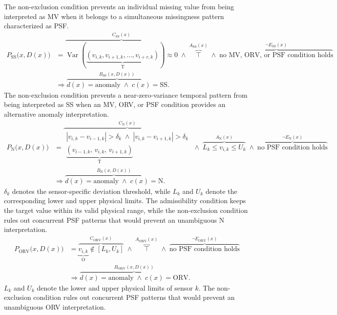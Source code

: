 \documentclass[preprint,12pt]{elsarticle}
\begin{document}
The non-exclusion condition prevents an individual missing value from being
interpreted as MV when it belongs to a simultaneous missingness pattern
characterized as PSF.
\begingroup
\scriptsize
\begin{equation}
\begin{aligned}
P_{\mathrm{SS}}\bigl(x,D(x)\bigr)
&=
\overbrace{
    \operatorname{Var}\!\left(
        \underbrace{
        (v_{i,k},v_{i+1,k},\ldots,v_{i+r,k})
        }_{\mathrm{T}}
    \right)
    \approx 0
}^{C_{\mathrm{SS}}(x)}
\;\land\;
\overbrace{
    \top
}^{A_{\mathrm{SS}}(x)}
\;\land\;
\overbrace{
    \text{no MV, ORV, or PSF condition holds}
}^{\neg E_{\mathrm{SS}}(x)}
\\[1mm]
&\Rightarrow
\overbrace{
    d(x)=\mathrm{anomaly}
    \;\land\;
    c(x)=\mathrm{SS}
}^{B_{\mathrm{SS}}(x,D(x))}.
\end{aligned}
\label{eq:property_ss}
\end{equation}
\endgroup
The non-exclusion condition prevents a near-zero-variance temporal pattern
from being interpreted as SS when an MV, ORV, or PSF condition provides an
alternative anomaly interpretation.
\begingroup
\scriptsize
\begin{equation}
\begin{aligned}
P_{\mathrm{N}}\bigl(x,D(x)\bigr)
&=
\overbrace{
    \substack{
    \left|v_{i,k}-v_{i-1,k}\right|>\delta_k
    \;\land\;
    \left|v_{i,k}-v_{i+1,k}\right|>\delta_k\\[1mm]
       \underbrace{
    (v_{i-1,k},\,v_{i,k},\,v_{i+1,k})
    }_{\mathrm{T}}
    }
}^{C_{\mathrm{N}}(x)}
\;\land\;
\overbrace{
    L_k\leq v_{i,k}\leq U_k
}^{A_{\mathrm{N}}(x)}
\;\land\;
\overbrace{
    \text{no PSF condition holds}
}^{\neg E_{\mathrm{N}}(x)}
\\[1mm]
&\Rightarrow
\overbrace{
    d(x)=\mathrm{anomaly}
    \;\land\;
    c(x)=\mathrm{N}
}^{B_{\mathrm{N}}(x,D(x))}.
\end{aligned}
\label{eq:property_n}
\end{equation}
\endgroup
\(\delta_k\) denotes the sensor-specific deviation threshold, while
\(L_k\) and \(U_k\) denote the corresponding lower and upper physical
limits. The admissibility condition keeps the target value within its valid
physical range, while the non-exclusion condition rules out concurrent PSF
patterns that would prevent an unambiguous N interpretation.
\begingroup
\scriptsize
\begin{equation}
\begin{aligned}
P_{\mathrm{ORV}}\bigl(x,D(x)\bigr)
&=
\overbrace{
    \underbrace{v_{i,k}}_{\mathrm{O}}\notin[L_k,U_k]
}^{C_{\mathrm{ORV}}(x)}
\;\land\;
\overbrace{
    \top
}^{A_{\mathrm{ORV}}(x)}
\;\land\;
\overbrace{
    \text{no PSF condition holds}
}^{\neg E_{\mathrm{ORV}}(x)}
\\[1mm]
&\Rightarrow
\overbrace{
    d(x)=\mathrm{anomaly}
    \;\land\;
    c(x)=\mathrm{ORV}
}^{B_{\mathrm{ORV}}(x,D(x))}.
\end{aligned}
\label{eq:property_orv}
\end{equation}
\endgroup
\(L_k\) and \(U_k\) denote the lower and upper physical limits of sensor
\(k\). The non-exclusion condition rules out concurrent PSF patterns that
would prevent an unambiguous ORV interpretation.
\end{document}
